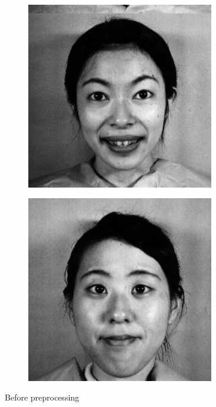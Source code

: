\documentclass[a4paper, 12pt]{article}
\begin{document}
\begin{figure}[H]
	\centering
	\begin{subfigure}[b]{0.4\textwidth}
		\includegraphics[width=0.9\textwidth]{./raw/img1.png}
	\end{subfigure}
	\begin{subfigure}[b]{0.4\textwidth}
		\includegraphics[width=0.9\textwidth]{./raw/img2.png}
	\end{subfigure}
	\caption[]{Before preprocessing}
	\label{fig:beforepre}
\end{figure}
\end{document}

